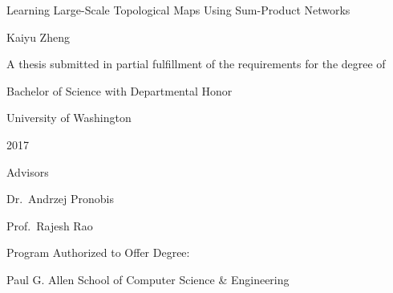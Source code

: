 \documentclass{thesis.tex}
\begin{document}
\begin{titlepage}
\centering
{}
\vspace*{\fill}
  \huge Learning Large-Scale Topological Maps Using Sum-Product Networks\normalsize

  \vspace{0.5in}

  \Large Kaiyu Zheng\large

  \vspace{2in}

  A thesis submitted in partial fulfillment of the requirements for the degree of

  \vspace{0.1in}

  Bachelor of Science with Departmental Honor

  \vspace{0.8in}
  University of Washington

  2017

  \vspace{0.4in}
  Advisors

  Dr.~Andrzej Pronobis

  Prof.~Rajesh Rao

  \vspace{0.8in}
  Program Authorized to Offer Degree:

  \vspace{0.1in}

  Paul G. Allen School of Computer Science \& Engineering\normalsize
\vspace*{\fill}

\end{titlepage}
\end{document}
